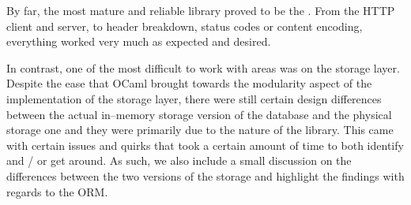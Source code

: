 By far, the most mature and reliable library proved to be the .
From the HTTP client and server, to header breakdown, status codes or content encoding, everything worked very much as expected and desired.

In contrast, one of the most difficult to work with areas was on the storage layer.
Despite the ease that OCaml brought towards the modularity aspect of the implementation of the storage layer, there were still certain design differences between the actual in--memory storage version of the database and the physical storage one and they were primarily due to the nature of the  library.
This came with certain issues and quirks that took a certain amount of time to both identify and / or get around.
As such, we also include a small discussion on the differences between the two versions of the storage and highlight the findings with regards to the ORM.
